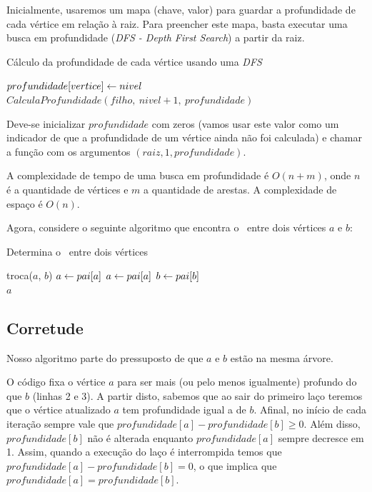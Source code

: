 Inicialmente, usaremos um mapa (chave, valor) para guardar a profundidade de cada vértice em relação à raiz. Para preencher este mapa, basta executar uma busca em profundidade (\emph{DFS - Depth First Search}) a partir da raiz.


\begin{algorithm}[H]
\caption{Cálculo da profundidade de cada vértice usando uma \emph{DFS}}
\begin{algorithmic}[1]
    \State $profundidade[vertice] \leftarrow nivel$
        \State $CalculaProfundidade(filho,\ nivel+1,\ profundidade)$
    \EndFor
\EndFunction
\end{algorithmic}
\end{algorithm}


Deve-se inicializar $profundidade$ com zeros (vamos usar este valor como um indicador de que a profundidade de um vértice ainda não foi calculada) e chamar a função com os argumentos $(raiz, 1, profundidade)$.

A complexidade de tempo de uma busca em profundidade é $O(n+m)$, onde $n$ é a quantidade de vértices e $m$ a quantidade de arestas. A complexidade de espaço é $O(n)$.

Agora, considere o seguinte algoritmo que encontra o \LCA\ entre dois vértices $a$ e $b$:


\begin{algorithm}[H]
\caption{Determina o \LCA\ entre dois vértices}
\begin{algorithmic}[1]
        \State troca($a$, $b$)
    \EndIf
        \State $a \leftarrow pai[a]$
    \EndWhile
        \State $a \leftarrow pai[a]$
        \State $b \leftarrow pai[b]$
    \EndWhile
    \\\hspace{5mm} \Return $a$
\EndFunction
\end{algorithmic}
\end{algorithm}


\subsection{Corretude}

Nosso algoritmo parte do pressuposto de que $a$ e $b$ estão na mesma árvore.

O código fixa o vértice $a$ para ser mais (ou pelo menos igualmente) profundo do que $b$ (linhas 2 e 3). A partir disto, sabemos que ao sair do primeiro laço teremos que o vértice atualizado $a$ tem profundidade igual a de $b$. Afinal, no início de cada iteração sempre vale que $profundidade[a] - profundidade[b] \geq 0$. Além disso, $profundidade[b]$ não é alterada enquanto $profundidade[a]$ sempre decresce em 1. Assim, quando a execução do laço é interrompida temos que $profundidade[a] - profundidade[b] = 0$, o que implica que  $profundidade[a] = profundidade[b]$.

